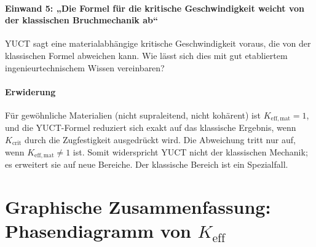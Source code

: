 \documentclass[12pt,a4paper]{article}
\newcommand{\Kcrit}{K_{\mathrm{crit}}}
\begin{document}
	\paragraph{Einwand 5: „Die Formel für die kritische Geschwindigkeit weicht von der klassischen Bruchmechanik ab“}
	YUCT sagt eine materialabhängige kritische Geschwindigkeit voraus, die von der klassischen Formel abweichen kann. Wie lässt sich dies mit gut etabliertem ingenieurtechnischem Wissen vereinbaren?
	
	\paragraph{Erwiderung}
	Für gewöhnliche Materialien (nicht supraleitend, nicht kohärent) ist \(K_{\mathrm{eff,mat}} = 1\), und die YUCT-Formel reduziert sich exakt auf das klassische Ergebnis, wenn \(\Kcrit\) durch die Zugfestigkeit ausgedrückt wird. Die Abweichung tritt nur auf, wenn \(K_{\mathrm{eff,mat}} \neq 1\) ist. Somit widerspricht YUCT nicht der klassischen Mechanik; es erweitert sie auf neue Bereiche. Der klassische Bereich ist ein Spezialfall.
	
	\section{Graphische Zusammenfassung: Phasendiagramm von \(K_{\mathrm{eff}}\)}
	\label{sec:diagram}
	
\end{document}
